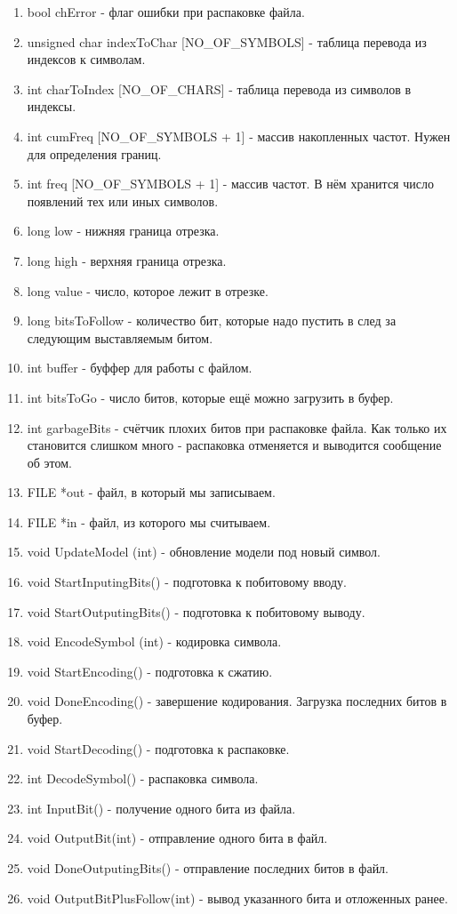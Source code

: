 \documentclass[12pt]{article}
\begin{document}
\begin{enumerate}
	\item bool chError - флаг ошибки при распаковке файла.
	\item unsigned char indexToChar [NO\_OF\_SYMBOLS] - таблица перевода из индексов к символам.
	\item int charToIndex [NO\_OF\_CHARS] - таблица перевода из символов в индексы.
	\item int cumFreq [NO\_OF\_SYMBOLS + 1] - массив накопленных частот. Нужен для определения границ.
	\item int freq [NO\_OF\_SYMBOLS + 1] - массив частот. В нём хранится число появлений тех или иных символов.
	\item long low - нижняя граница отрезка. 
	\item long high - верхняя граница отрезка.
	\item long value - число, которое лежит в отрезке.
	\item long bitsToFollow - количество бит, которые надо пустить в след за следующим выставляемым битом.
	\item int buffer - буффер для работы с файлом.
	\item int bitsToGo - число битов, которые ещё можно загрузить в буфер.
	\item int garbageBits - счётчик плохих битов при распаковке файла. Как только их становится слишком много - распаковка отменяется и выводится сообщение об этом.
	\item FILE *out - файл, в который мы записываем.
	\item FILE *in - файл, из которого мы считываем.
	\item void UpdateModel (int) - обновление модели под новый символ.
	\item void StartInputingBits() - подготовка к побитовому вводу.
	\item void StartOutputingBits() - подготовка к побитовому выводу.
	\item void EncodeSymbol (int) - кодировка символа.
	\item void StartEncoding() - подготовка к сжатию.
	\item void DoneEncoding() - завершение кодирования. Загрузка последних битов в буфер.
	\item void StartDecoding() - подготовка к распаковке.
	\item int DecodeSymbol() - распаковка символа.
	\item int InputBit() - получение одного бита из файла.
	\item void OutputBit(int) - отправление одного бита в файл.
	\item void DoneOutputingBits() - отправление последних битов в файл.
	\item void OutputBitPlusFollow(int) - вывод указанного бита и отложенных ранее.
\end{enumerate}
\end{document}
